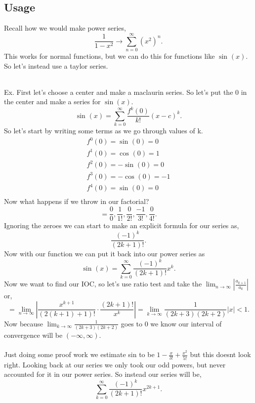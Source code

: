 \subsection*{Usage}%
\label{sub:Usage}
Recall how we would make power series,
\[
\frac{ 1 }{ 1-x^2 } \to \sum_{ n=0 } ^{ \infty } \left( x^2 \right) ^{ n }
.\] 
This works for normal functions, but we can do this for functions like $ \sin^{  } \left( x \right)  $. So let's instead use a taylor series.\\ \\
\begin{exampleblock}{Ex.}
	First let's choose a center and make a maclaurin series. So let's put the 0 in the center and make a series for $ \sin\left( x \right)  $.
	\[
	\sin^{  } \left( x \right) = \sum_{ k=0 } ^{ \infty } \frac{ f^{ k }\left( 0 \right)  }{ k! }\left( x-c \right) ^{ k }
	.\] 
	So let's start by writing some terms as we go through values of k. 
	\begin{gather*}
	f^{ 0 }\left( 0 \right) =\sin^{  } \left( 0 \right) =0 \\
	f^{ 1 }\left( 0 \right) =\cos^{  } \left( 0 \right) =1 \\
	f^{ 2 }\left( 0 \right) =-\sin^{  } \left( 0 \right) =0 \\
	f^{ 3 }\left( 0 \right) =-\cos^{  } \left( 0 \right) =-1 \\
	f^{ 4 }\left( 0 \right) =\sin^{  } \left( 0 \right) =0 \\
	\end{gather*}
	Now what happens if we throw in our factorial?
	\[
	=\frac{ 0 }{ 0 } , \frac{ 1 }{ 1! }, \frac{ 0 }{ 2! }, \frac{ -1 }{ 3! }, \frac{ 0 }{ 4! }
	.\] 
	Ignoring the zeroes we can start to make an explicit formula for our series as,
	\[
	\frac{ \left( -1 \right) ^{ k } }{ \left( 2k+1 \right) ! }
	.\] 
	Now with our function we can put it back into our power series as
	\[
	\sin^{  } \left( x \right) =\sum_{ k=0 } ^{ \infty } \frac{ \left( -1 \right) ^{ k } }{ \left( 2k+1 \right) ! }x^{ k }
	.\] 
	Now we want to find our IOC, so let's use ratio test and take the $ \lim_{ n \to \infty} \left| \frac{ a_{ k+1 } }{ a_k } \right| $ or,
	\[
	=\lim_{ n \to \infty} \left| \frac{ x^{ k+1 } }{ \left( 2\left( k+1 \right) +1 \right) ! }\cdot \frac{ \left( 2k+1 \right) ! }{ x^{ k } } \right| = \lim_{ k \to \infty} \frac{ 1 }{ \left( 2k+3 \right) \left( 2k+2 \right)  } \left| x \right|<1
	.\] 
	Now because $ \lim_{ k \to \infty} \frac{ 1 }{ \left( 2k+3 \right) \left( 2k+2 \right)  }  $ goes to 0 we know our interval of convergence will be $ \left( -\infty,\infty \right)  $.  \\ \\ 
	Just doing some proof work we estimate sin to be $ 1-\frac{ x }{ 3! } +\frac{ x^2 }{ 5! }  $ but this doesnt look right. Looking back at our series we only took our odd powers, but never accounted for it in our power series. So instead our series will be,
	\[
	\sum_{ k=0 } ^{ \infty } \frac{ \left( -1 \right) ^{ k } }{ \left( 2k+1 \right) ! }x^{ 2k+1 }
	.\] 

\end{exampleblock}
